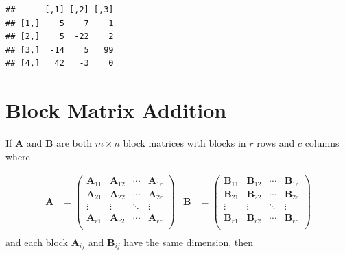 \documentclass[
]{book}
\theoremstyle{definition}
\theoremstyle{definition}
\theoremstyle{definition}
\theoremstyle{definition}
\theoremstyle{remark}
\begin{document}
\begin{verbatim}
##      [,1] [,2] [,3]
## [1,]    5    7    1
## [2,]    5  -22    2
## [3,]  -14    5   99
## [4,]   42   -3    0
\end{verbatim}

\hypertarget{block-matrix-addition}{%
\section{Block Matrix Addition}\label{block-matrix-addition}}

If \(\mathbf{A}\) and \(\mathbf{B}\) are both \(m \times n\) block matrices with blocks in \(r\) rows and \(c\) columns where

\[
\begin{aligned}
\mathbf{A} & =
\begin{pmatrix} \mathbf{A}_{11} & \mathbf{A}_{12} & \cdots & \mathbf{A}_{1c}\\
\mathbf{A}_{21} & \mathbf{A}_{22} &\cdots & \mathbf{A}_{2c} \\
\vdots & \vdots & \ddots & \vdots \\
\mathbf{A}_{r1} & \mathbf{A}_{r2} &\cdots & \mathbf{A}_{rc} \\
\end{pmatrix} &
\mathbf{B} & =
\begin{pmatrix} \mathbf{B}_{11} & \mathbf{B}_{12} & \cdots & \mathbf{B}_{1c}\\
\mathbf{B}_{21} & \mathbf{B}_{22} &\cdots & \mathbf{B}_{2c} \\
\vdots & \vdots & \ddots & \vdots \\
\mathbf{B}_{r1} & \mathbf{B}_{r2} &\cdots & \mathbf{B}_{rc} \\
\end{pmatrix} \\
\end{aligned}
\]
and each block \(\mathbf{A}_{ij}\) and \(\mathbf{B}_{ij}\) have the same dimension, then
\end{document}
